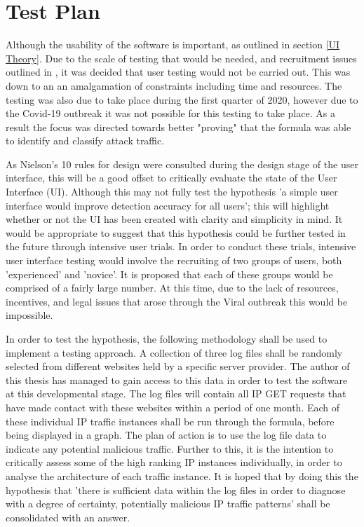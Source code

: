 \section{Test Plan}

Although the usability of the software is important, as outlined in section \ref{UI Theory}. Due to the scale of testing that would be needed, and recruitment issues outlined in \cite{ben2015effects}, it was decided that user testing would not be carried out. This was down to an an amalgamation of constraints including time and resources. The testing was also due to take place during the first quarter of 2020, however due to the Covid-19 outbreak it was not possible for this testing to take place. As a result the focus was directed towards better "proving" that the formula was able to identify and classify attack traffic. 


As Nielson's 10 rules for design were consulted during the design stage of the user interface, this will be a good offset to critically evaluate the state of the User Interface (UI). Although this may not fully test the hypothesis 'a simple user interface would improve detection accuracy for all users'; this will highlight whether or not the UI has been created with clarity and simplicity in mind. It would be appropriate to suggest that this hypothesis could be further tested in the future through intensive user trials. In order to conduct these trials, intensive user interface testing would involve the recruiting of two groups of users, both 'experienced' and 'novice'. It is proposed that each of these groups would be comprised of a fairly large number. At this time, due to the lack of resources, incentives, and legal issues that arose through the Viral outbreak this would be impossible.

In order to test the hypothesis, the following methodology shall be used to implement a testing approach. A collection of three log files shall be randomly selected from different websites held by a specific server provider. The author of this thesis has managed to gain access to this data in order to test the software at this developmental stage. The log files will contain all IP GET requests that have made contact with these websites within a period of one month. Each of these individual IP traffic instances shall be run through the formula, before being displayed in a graph. The plan of action is to use the log file data to indicate any potential malicious traffic. Further to this, it is the intention to critically assess some of the high ranking IP instances individually, in order to analyse the architecture of each traffic instance. It is hoped that by doing this the hypothesis that 'there is sufficient data within the log files in order to diagnose with a degree of certainty, potentially malicious IP traffic patterns' shall be consolidated with an answer. 

